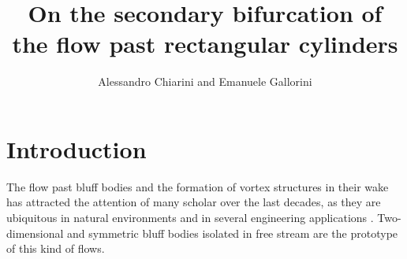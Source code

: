 \documentclass{jfm}
\begin{document}
\title{On the secondary bifurcation of the flow past rectangular cylinders}
\author{Alessandro Chiarini and Emanuele Gallorini}
\maketitle

\section{Introduction}

The flow past bluff bodies and the formation of vortex structures in their wake has attracted the attention of many scholar over the last decades, as they are ubiquitous in natural environments and in several engineering applications \citep{oertel-1990,williamson-1996b,choi-etal-2008,thompson-etal-2021}. Two-dimensional and symmetric bluff bodies isolated in free stream are the prototype of this kind of flows.
\end{document}
